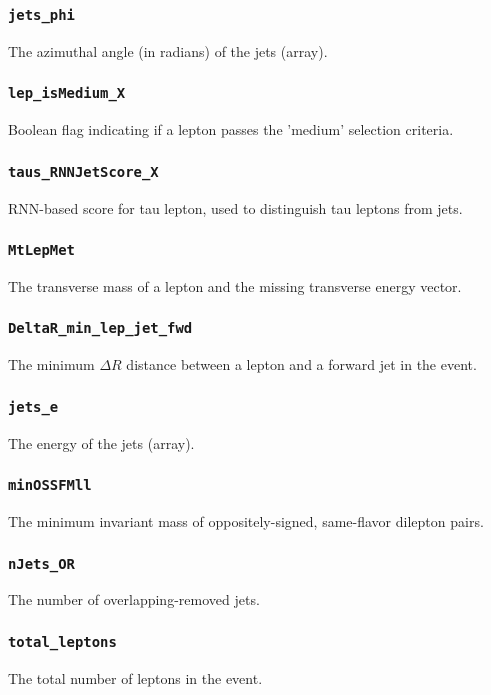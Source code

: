 \subsubsection{\texttt{jets\_phi}} The azimuthal angle (in radians) of the jets (array).

\subsubsection{\texttt{lep\_isMedium\_X}} Boolean flag indicating if a lepton passes the 'medium' selection criteria.

\subsubsection{\texttt{taus\_RNNJetScore\_X}} RNN-based score for tau lepton, used to distinguish tau leptons from jets.

\subsubsection{\texttt{MtLepMet}} The transverse mass of a lepton and the missing transverse energy vector.

\subsubsection{\texttt{DeltaR\_min\_lep\_jet\_fwd}} The minimum $\Delta R$ distance between a lepton and a forward jet in the event.

\subsubsection{\texttt{jets\_e}} The energy of the jets (array).

\subsubsection{\texttt{minOSSFMll}} The minimum invariant mass of oppositely-signed, same-flavor dilepton pairs.

\subsubsection{\texttt{nJets\_OR}} The number of overlapping-removed jets.

\subsubsection{\texttt{total\_leptons}} The total number of leptons in the event.

